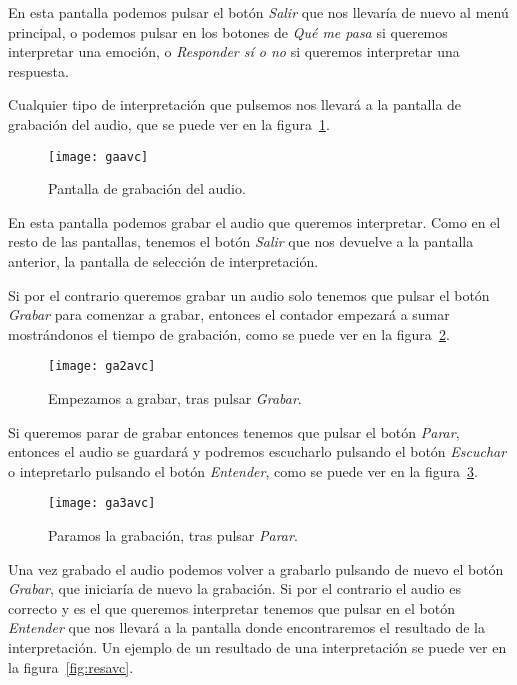 En esta pantalla podemos pulsar el botón \textit{Salir} que nos llevaría de nuevo al menú principal, o podemos pulsar en los botones de \textit{Qué me pasa} si queremos interpretar una emoción, o \textit{Responder sí o no} si queremos interpretar una respuesta.

Cualquier tipo de interpretación que pulsemos nos llevará a la pantalla de grabación del audio, que se puede ver en la figura~\ref{fig:gaavc}.

\begin{figure}[H]
	\centering
	\texttt{[image: gaavc]}
	\caption{Pantalla de grabación del audio.}
	\label{fig:gaavc}
\end{figure}

En esta pantalla podemos grabar el audio que queremos interpretar. Como en el resto de las pantallas, tenemos el botón \textit{Salir} que nos devuelve a la pantalla anterior, la pantalla de selección de interpretación.

Si por el contrario queremos grabar un audio solo tenemos que pulsar el botón \textit{Grabar} para comenzar a grabar, entonces el contador empezará a sumar mostrándonos el tiempo de grabación, como se puede ver en la figura~\ref{fig:ga2avc}.

\begin{figure}[H]
	\centering
	\texttt{[image: ga2avc]}
	\caption{Empezamos a grabar, tras pulsar \textit{Grabar}.}
	\label{fig:ga2avc}
\end{figure}

Si queremos parar de grabar entonces tenemos que pulsar el botón \textit{Parar}, entonces el audio se guardará y podremos escucharlo pulsando el botón \textit{Escuchar} o intepretarlo pulsando el botón \textit{Entender}, como se puede ver en la figura~\ref{fig:ga3avc}.

\begin{figure}[H]
	\centering
	\texttt{[image: ga3avc]}
	\caption{Paramos la grabación, tras pulsar \textit{Parar}.}
	\label{fig:ga3avc}
\end{figure}

Una vez grabado el audio podemos volver a grabarlo pulsando de nuevo el botón \textit{Grabar}, que iniciaría de nuevo la grabación. Si por el contrario el audio es correcto y es el que queremos interpretar tenemos que pulsar en el botón \textit{Entender} que nos llevará a la pantalla donde encontraremos el resultado de la interpretación. Un ejemplo de un resultado de una interpretación se puede ver en la figura~\ref{fig:resavc}.

